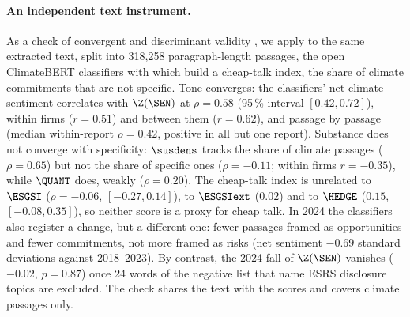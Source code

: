 
\paragraph{An independent text instrument.} As a check of convergent and
discriminant validity \citep{campbell1959}, we apply to the same extracted text,
split into 318{,}258 paragraph-length passages, the open ClimateBERT classifiers
\citep{webersinke2021} with which \citet{bingler2022,bingler2024} build a
cheap-talk index, the share of climate commitments that are not specific. Tone
converges: the classifiers' net climate sentiment correlates with $\Z(\SEN)$ at
$\rho = 0.58$ (95\,\% interval $[0.42, 0.72]$), within firms ($r = 0.51$) and
between them ($r = 0.62$), and passage by passage (median within-report
$\rho = 0.42$, positive in all but one report). Substance does not converge with
specificity: $\susdens$ tracks the share of climate passages ($\rho = 0.65$) but
not the share of specific ones ($\rho = -0.11$; within firms $r = -0.35$), while
$\QUANT$ does, weakly ($\rho = 0.20$). The cheap-talk index is unrelated to
$\ESGSI$ ($\rho = -0.06$, $[-0.27, 0.14]$), to $\ESGSIext$ ($0.02$) and to
$\HEDGE$ ($0.15$, $[-0.08, 0.35]$), so neither score is a proxy for cheap talk.
In 2024 the classifiers also register a change, but a different one: fewer
passages framed as opportunities and fewer commitments, not more framed as risks
(net sentiment $-0.69$ standard deviations against 2018--2023). By contrast, the
2024 fall of $\Z(\SEN)$ vanishes ($-0.02$, $p = 0.87$) once 24 words of the
negative list that name ESRS disclosure topics are excluded. The check shares the
text with the scores and covers climate passages only.
